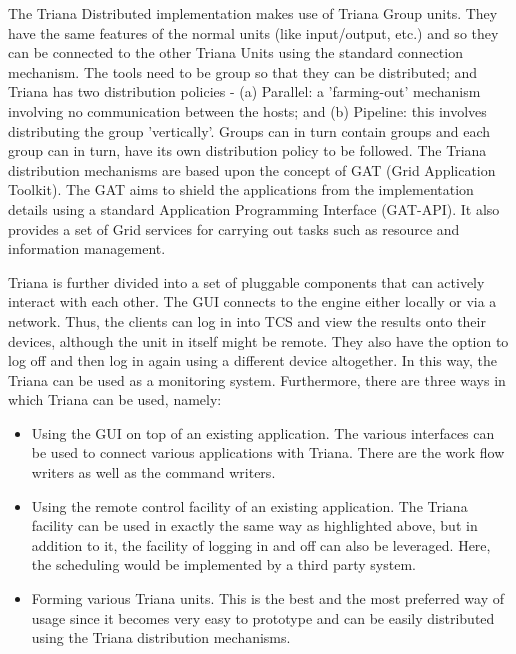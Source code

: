 \documentclass[9pt,twocolumn,twoside]{../../styles/osajnl}
\begin{document}
The Triana Distributed implementation makes use of Triana Group units.
They have the same features of the normal units (like input/output,
etc.) and so they can be connected to the other Triana Units using the
standard connection mechanism.  The tools need to be group so that
they can be distributed; and Triana has two distribution policies -
(a) Parallel: a 'farming-out' mechanism involving no communication between
the hosts; and (b) Pipeline: this involves distributing the group
'vertically'.  Groups can in turn contain groups and each group can in
turn, have its own distribution policy to be followed.  The Triana
distribution mechanisms are based upon the concept of GAT (Grid
Application Toolkit).  The GAT aims to shield the applications from
the implementation details using a standard Application Programming
Interface (GAT-API).  It also provides a set of Grid services for
carrying out tasks such as resource and information management.

Triana is further divided into a set of pluggable components that can 
actively interact with each other. The GUI connects to the engine either 
locally or via a network. Thus, the clients can log in into TCS and view 
the results onto their devices, although the unit in itself might be 
remote. They also have the option to log off and then log in again using 
a different device altogether. In this way, the Triana can be used as a 
monitoring system. Furthermore, there are three ways in which Triana can 
be used, namely: 

\begin{itemize} 

\item Using the GUI on top of an existing application. The various 
interfaces can be used to connect various applications with Triana. 
There are the work flow writers as well as the command writers. 

\item Using the remote control facility of an existing application. The 
Triana facility can be used in exactly the same way as highlighted 
above, but in addition to it, the facility of logging in and off can 
also be leveraged. Here, the scheduling would be implemented by a third 
party system. 

\item Forming various Triana units. This is the best and the most 
preferred way of usage since it becomes very easy to prototype and can 
be easily distributed using the Triana distribution mechanisms. 

\end{itemize} 
\end{document}
